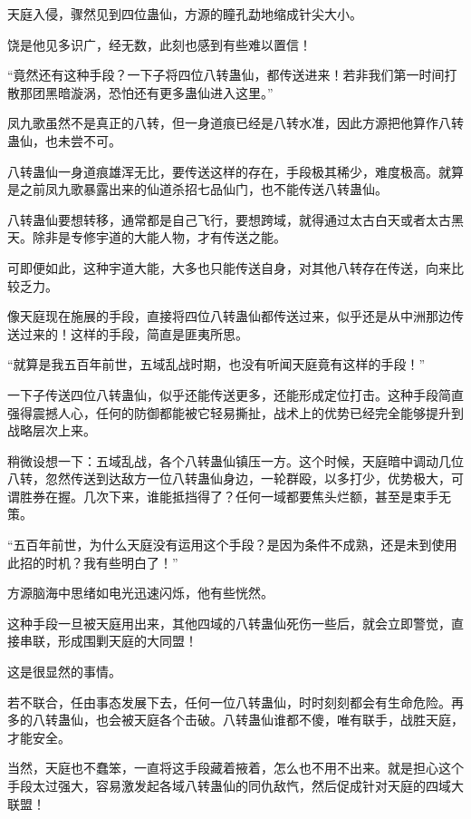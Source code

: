 
\begin{this_body}



天庭入侵，骤然见到四位蛊仙，方源的瞳孔勐地缩成针尖大小。

饶是他见多识广，经无数，此刻也感到有些难以置信！

“竟然还有这种手段？一下子将四位八转蛊仙，都传送进来！若非我们第一时间打散那团黑暗漩涡，恐怕还有更多蛊仙进入这里。”

凤九歌虽然不是真正的八转，但一身道痕已经是八转水准，因此方源把他算作八转蛊仙，也未尝不可。

八转蛊仙一身道痕雄浑无比，要传送这样的存在，手段极其稀少，难度极高。就算是之前凤九歌暴露出来的仙道杀招七品仙门，也不能传送八转蛊仙。

八转蛊仙要想转移，通常都是自己飞行，要想跨域，就得通过太古白天或者太古黑天。除非是专修宇道的大能人物，才有传送之能。

可即便如此，这种宇道大能，大多也只能传送自身，对其他八转存在传送，向来比较乏力。

像天庭现在施展的手段，直接将四位八转蛊仙都传送过来，似乎还是从中洲那边传送过来的！这样的手段，简直是匪夷所思。

“就算是我五百年前世，五域乱战时期，也没有听闻天庭竟有这样的手段！”

一下子传送四位八转蛊仙，似乎还能传送更多，还能形成定位打击。这种手段简直强得震撼人心，任何的防御都能被它轻易撕扯，战术上的优势已经完全能够提升到战略层次上来。

稍微设想一下：五域乱战，各个八转蛊仙镇压一方。这个时候，天庭暗中调动几位八转，忽然传送到达敌方一位八转蛊仙身边，一轮群殴，以多打少，优势极大，可谓胜券在握。几次下来，谁能抵挡得了？任何一域都要焦头烂额，甚至是束手无策。

“五百年前世，为什么天庭没有运用这个手段？是因为条件不成熟，还是未到使用此招的时机？我有些明白了！”

方源脑海中思绪如电光迅速闪烁，他有些恍然。

这种手段一旦被天庭用出来，其他四域的八转蛊仙死伤一些后，就会立即警觉，直接串联，形成围剿天庭的大同盟！

这是很显然的事情。

若不联合，任由事态发展下去，任何一位八转蛊仙，时时刻刻都会有生命危险。再多的八转蛊仙，也会被天庭各个击破。八转蛊仙谁都不傻，唯有联手，战胜天庭，才能安全。

当然，天庭也不蠢笨，一直将这手段藏着掖着，怎么也不用不出来。就是担心这个手段太过强大，容易激发起各域八转蛊仙的同仇敌忾，然后促成针对天庭的四域大联盟！


\end{this_body}
